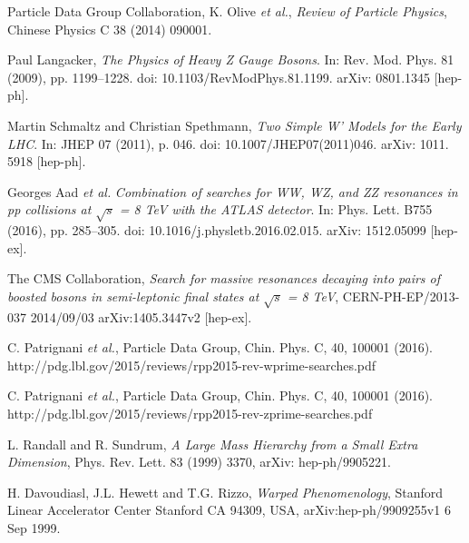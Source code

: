 \documentclass[UKenglish,texlive=2013]{\ATLASLATEXPATH atlasdoc}
\newcommand{\cme}{\sqrt{s}}
\begin{document}




\begin{thebibliography}{9}

  Particle Data Group Collaboration, K. Olive \emph{et al.},
  \emph{ Review of Particle Physics},
Chinese Physics C 38 (2014) 090001.

Paul Langacker,
\emph{The Physics of Heavy
Z Gauge Bosons}. In: Rev. Mod. Phys.
81 (2009), pp. 1199–1228. doi: 10.1103/RevModPhys.81.1199. arXiv: 0801.1345
[hep-ph].

Martin Schmaltz and Christian Spethmann,
\emph{Two Simple W’ Models for the Early
LHC}. In: JHEP 07 (2011), p. 046. doi: 10.1007/JHEP07(2011)046. arXiv: 1011.
5918 [hep-ph].

Georges Aad {\it et al.}
\emph{Combination of searches for WW, WZ, and ZZ resonances
in pp collisions at $\sqrt{s}$ = 8 TeV with the ATLAS detector}. In: Phys. Lett. B755
(2016), pp. 285–305. doi: 10.1016/j.physletb.2016.02.015. arXiv: 1512.05099
[hep-ex].

The CMS Collaboration,
\emph{Search for massive resonances decaying into pairs of boosted bosons in semi-leptonic final states at $\cme$ = 8 TeV},
CERN-PH-EP/2013-037
2014/09/03
arXiv:1405.3447v2 [hep-ex].

C. Patrignani \emph{et al.},
Particle Data Group, Chin. Phys. C, 40, 100001 (2016).
http://pdg.lbl.gov/2015/reviews/rpp2015-rev-wprime-searches.pdf

C. Patrignani \emph{et al.},
Particle Data Group, Chin. Phys. C, 40, 100001 (2016).
http://pdg.lbl.gov/2015/reviews/rpp2015-rev-zprime-searches.pdf

L. Randall and R. Sundrum,
\emph{A Large Mass Hierarchy from a Small Extra Dimension},
Phys. Rev. Lett. 83 (1999) 3370, arXiv: hep-ph/9905221.

H. Davoudiasl, J.L. Hewett and T.G. Rizzo,
\emph{Warped Phenomenology},
Stanford Linear Accelerator Center
Stanford CA 94309, USA,
arXiv:hep-ph/9909255v1 6 Sep 1999.


\end{thebibliography}
\end{document}
